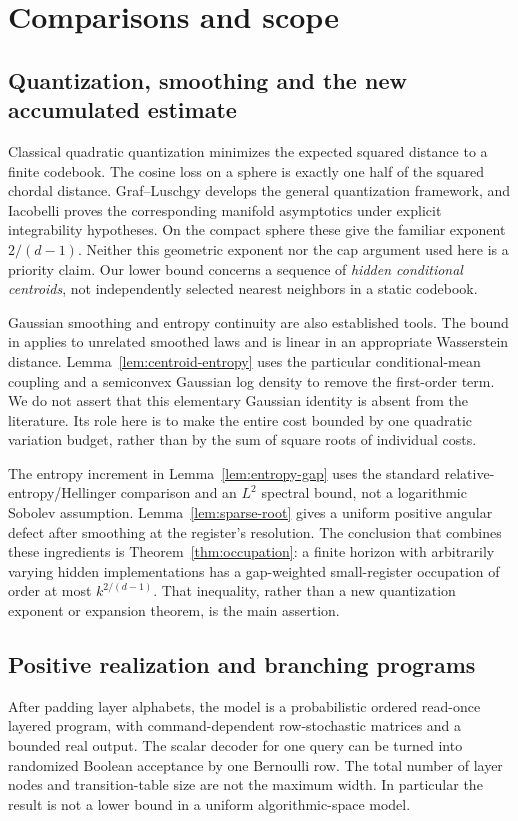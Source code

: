 \section{Comparisons and scope}\label{sec:comparison}
\subsection{Quantization, smoothing and the new accumulated estimate}
Classical quadratic quantization minimizes the expected squared distance
to a finite codebook. The cosine loss on a sphere is exactly one half of
the squared chordal distance. Graf--Luschgy \cite{GL} develops the general
quantization framework, and Iacobelli \cite[Theorem 1.4]{Iac} proves the
corresponding manifold asymptotics under explicit integrability
hypotheses. On the compact sphere these give the familiar exponent
$2/(d-1)$. Neither this geometric exponent nor the cap argument used
here is a priority claim. Our lower bound concerns a sequence of
\emph{hidden conditional centroids}, not independently selected nearest
neighbors in a static codebook.

Gaussian smoothing and entropy continuity are also established tools.
The bound in \cite[Corollary 4]{PW} applies to unrelated smoothed laws
and is linear in an appropriate Wasserstein distance. Lemma~\ref{lem:centroid-entropy}
uses the particular conditional-mean coupling and a semiconvex Gaussian
log density to remove the first-order term. We do not assert that this
elementary Gaussian identity is absent from the literature. Its role
here is to make the entire cost bounded by one quadratic variation
budget, rather than by the sum of square roots of individual costs.

The entropy increment in Lemma~\ref{lem:entropy-gap} uses the standard
relative-entropy/Hellinger comparison and an $L^2$ spectral bound, not
a logarithmic Sobolev assumption. Lemma~\ref{lem:sparse-root} gives a
uniform positive angular defect after smoothing at the register's
resolution. The conclusion that combines these ingredients is
Theorem~\ref{thm:occupation}: a finite horizon with arbitrarily varying
hidden implementations has a gap-weighted small-register occupation
of order at most $k^{2/(d-1)}$. That inequality, rather than a new
quantization exponent or expansion theorem, is the main assertion.

\subsection{Positive realization and branching programs}
After padding layer alphabets, the model is a probabilistic ordered
read-once layered program, with command-dependent row-stochastic
matrices and a bounded real output. The scalar decoder for one query
can be turned into randomized Boolean acceptance by one Bernoulli row.
The total number of layer nodes and transition-table size are not the
maximum width. In particular the result is not a lower bound in a
uniform algorithmic-space model.

